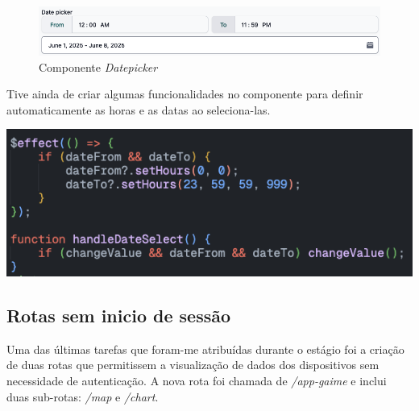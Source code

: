\begin{figure}[!h]
	\centering
	\includegraphics[width=\textwidth]{figs/datepicker.png}
	\caption{Componente \textit{Datepicker}}
	\label{fig:Datepicker}
\end{figure}

\begin{multicols}{2}
Tive ainda de criar algumas funcionalidades no componente para definir automaticamente as horas e as datas ao seleciona-las.

\columnbreak

\begin{center}
	\includegraphics[width=0.8\columnwidth]{figs/componenteClick.png}
	\label{fig:SelecionarDatepicker}
\end{center}
\end{multicols}

\clearpage
\subsection{Rotas sem inicio de sessão}\label{sec:noLoginInterface} %
Uma das últimas tarefas que foram-me atribuídas durante o estágio foi a criação de duas rotas que permitissem a visualização de dados dos dispositivos sem necessidade de autenticação. A nova rota foi chamada de \textit{/app-gaime} e inclui duas sub-rotas: \textit{/map} e \textit{/chart}.

